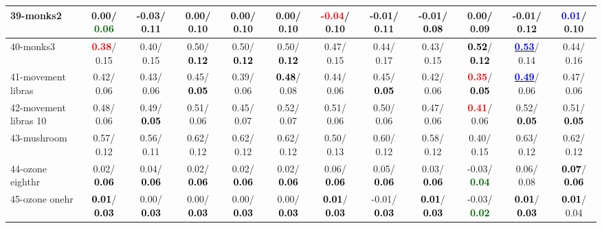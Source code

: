 \begin{table}[h]
\begin{center}
{\begin{tabular}{lc|c|c|c|c|c|c|c|c|c|c}
39-monks2 &   0.00/\textcolor{darkgreen}{\textbf{  0.06}} &  -0.03/  0.11 &   0.00/  0.10 &   0.00/  0.10 &   0.00/  0.10 & \textcolor{red}{\textbf{ -0.04}}/  0.10 &  -0.01/  0.11 &  -0.01/\textcolor{black}{\textbf{  0.08}} &   0.00/  0.09 &  -0.01/  0.12 & \textcolor{blue}{\textbf{  0.01}}/  0.10 \\ \hline
40-monks3 & \textcolor{red}{\textbf{  0.38}}/  0.15 &   0.40/  0.15 &   0.50/\textcolor{black}{\textbf{  0.12}} &   0.50/\textcolor{black}{\textbf{  0.12}} &   0.50/\textcolor{black}{\textbf{  0.12}} &   0.47/  0.15 &   0.44/  0.17 &   0.43/  0.15 & \textcolor{black}{\textbf{  0.52}}/\textcolor{black}{\textbf{  0.12}} & \underline{\textcolor{blue}{\textbf{  0.53}}}/  0.14 &   0.44/  0.16 \\
41-movement libras &   0.42/  0.06 &   0.43/  0.06 &   0.45/\textcolor{black}{\textbf{  0.05}} &   0.39/  0.06 & \textcolor{black}{\textbf{  0.48}}/  0.08 &   0.44/  0.06 &   0.45/\textcolor{black}{\textbf{  0.05}} &   0.42/  0.06 & \textcolor{red}{\textbf{  0.35}}/\textcolor{black}{\textbf{  0.05}} & \underline{\textcolor{blue}{\textbf{  0.49}}}/  0.06 &   0.47/  0.06 \\
42-movement libras 10 &   0.48/  0.06 &   0.49/\textcolor{black}{\textbf{  0.05}} &   0.51/  0.06 &   0.45/  0.07 &   0.52/  0.07 &   0.51/  0.06 &   0.50/  0.06 &   0.47/  0.06 & \textcolor{red}{\textbf{  0.41}}/  0.06 &   0.52/\textcolor{black}{\textbf{  0.05}} &   0.51/\textcolor{black}{\textbf{  0.05}} \\
43-mushroom &   0.57/  0.12 &   0.56/  0.11 &   0.62/  0.12 &   0.62/  0.12 &   0.62/  0.12 &   0.50/  0.13 &   0.60/  0.12 &   0.58/  0.12 &   0.40/  0.15 &   0.63/  0.12 &   0.62/  0.12 \\
44-ozone eighthr &   0.02/\textcolor{black}{\textbf{  0.06}} &   0.04/\textcolor{black}{\textbf{  0.06}} &   0.02/\textcolor{black}{\textbf{  0.06}} &   0.02/\textcolor{black}{\textbf{  0.06}} &   0.02/\textcolor{black}{\textbf{  0.06}} &   0.06/\textcolor{black}{\textbf{  0.06}} &   0.05/\textcolor{black}{\textbf{  0.06}} &   0.03/\textcolor{black}{\textbf{  0.06}} &  -0.03/\textcolor{darkgreen}{\textbf{  0.04}} &   0.06/  0.08 & \textcolor{black}{\textbf{  0.07}}/\textcolor{black}{\textbf{  0.06}} \\
45-ozone onehr & \textcolor{black}{\textbf{  0.01}}/\textcolor{black}{\textbf{  0.03}} &   0.00/\textcolor{black}{\textbf{  0.03}} &   0.00/\textcolor{black}{\textbf{  0.03}} &   0.00/\textcolor{black}{\textbf{  0.03}} &   0.00/\textcolor{black}{\textbf{  0.03}} & \textcolor{black}{\textbf{  0.01}}/\textcolor{black}{\textbf{  0.03}} &  -0.01/\textcolor{black}{\textbf{  0.03}} & \textcolor{black}{\textbf{  0.01}}/\textcolor{black}{\textbf{  0.03}} &  -0.03/\textcolor{darkgreen}{\textbf{  0.02}} & \textcolor{black}{\textbf{  0.01}}/\textcolor{black}{\textbf{  0.03}} & \textcolor{black}{\textbf{  0.01}}/  0.04 \\

\end{tabular}}
\end{center}
\end{table}
